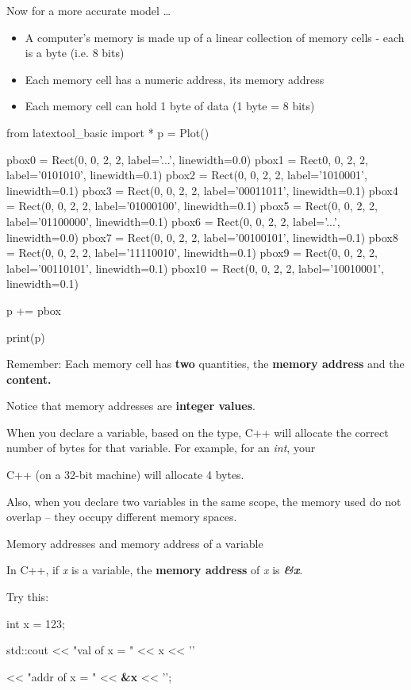 Now for a more accurate model \ldots{}

\begin{itemize}
\tightlist
\item
  A computer's memory is made up of a linear collection of memory cells
  - each is a byte (i.e. 8 bits)
\item
  Each memory cell has a numeric address, its memory address
\item
  Each memory cell can hold 1 byte of data (1 byte = 8 bits)
\end{itemize}

\begin{python}
from latextool_basic import *
p = Plot()

pbox0 = Rect(0, 0, 2, 2, label='...', linewidth=0.0)
pbox1 = Rect0, 0, 2, 2, label='0101010', linewidth=0.1)
pbox2 = Rect(0, 0, 2, 2, label='1010001', linewidth=0.1)
pbox3 = Rect(0, 0, 2, 2, label='00011011', linewidth=0.1)
pbox4 = Rect(0, 0, 2, 2, label='01000100', linewidth=0.1)
pbox5 = Rect(0, 0, 2, 2, label='01100000', linewidth=0.1)
pbox6 = Rect(0, 0, 2, 2, label='...', linewidth=0.0)
pbox7 = Rect(0, 0, 2, 2, label='00100101', linewidth=0.1)
pbox8 = Rect(0, 0, 2, 2, label='11110010', linewidth=0.1)
pbox9 = Rect(0, 0, 2, 2, label='00110101', linewidth=0.1)
pbox10 = Rect(0, 0, 2, 2, label='10010001', linewidth=0.1)

p += pbox

print(p)
\end{python}

Remember: Each memory cell has \textbf{two} quantities, the \textbf{memory address} and the \textbf{content.}

Notice that memory addresses are \textbf{integer values}.

When you declare a variable, based on the type, C++ will allocate the correct number of bytes for that variable. For example, for an \emph{int}, your

C++ (on a 32-bit machine) will allocate 4 bytes.

Also, when you declare two variables in the same scope, the memory used do not overlap -- they occupy different memory spaces.

Memory addresses and memory address of a variable

In C++, if \emph{x} is a variable, the \textbf{memory address} of
\emph{x} is \emph{\textbf{\&x}}.

Try this:

\begin{consolethree}[escapeinside=||]

int x = 123;

std::cout << "val of x = " << x << '\n'

<< "addr of x = " << \textbf{\&x} << '\n';
\end{consolethree}


